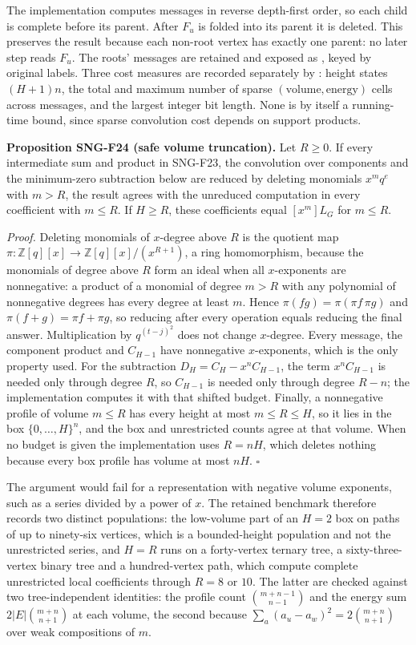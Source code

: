 \documentclass[
  11pt,
  a4paper,
]{report}
\let\singularitytexttt\texttt
\renewcommand{\texttt}[1]{\singularitytexttt{\seqsplit{#1}}}
\begin{document}
The implementation computes messages in reverse depth-first order, so
each child is complete before its parent. After \(F_u\) is folded into
its parent it is deleted. This preserves the result because each
non-root vertex has exactly one parent: no later step reads \(F_u\). The
roots' messages are retained and exposed as \texttt{root\_messages},
keyed by original labels. Three cost measures are recorded separately by
\texttt{transfer\_statistics}: height states \((H+1)n\), the total and
maximum number of sparse \((\text{volume},\text{energy})\) cells across
messages, and the largest integer bit length. None is by itself a
running-time bound, since sparse convolution cost depends on support
products.

\textbf{Proposition SNG-F24 (safe volume truncation).} Let \(R\ge0\). If
every intermediate sum and product in SNG-F23, the convolution over
components and the minimum-zero subtraction below are reduced by
deleting monomials \(x^mq^e\) with \(m>R\), the result agrees with the
unreduced computation in every coefficient with \(m\le R\). If
\(H\ge R\), these coefficients equal \([x^m]L_G\) for \(m\le R\).

\emph{Proof.} Deleting monomials of \(x\)-degree above \(R\) is the
quotient map \(\pi:\mathbb Z[q][x]\to\mathbb Z[q][x]/(x^{R+1})\), a ring
homomorphism, because the monomials of degree above \(R\) form an ideal
when all \(x\)-exponents are nonnegative: a product of a monomial of
degree \(m>R\) with any polynomial of nonnegative degrees has every
degree at least \(m\). Hence \(\pi(fg)=\pi(\pi f\,\pi g)\) and
\(\pi(f+g)=\pi f+\pi g\), so reducing after every operation equals
reducing the final answer. Multiplication by \(q^{(t-j)^2}\) does not
change \(x\)-degree. Every message, the component product and
\(C_{H-1}\) have nonnegative \(x\)-exponents, which is the only property
used. For the subtraction \(D_H=C_H-x^nC_{H-1}\), the term
\(x^nC_{H-1}\) is needed only through degree \(R\), so \(C_{H-1}\) is
needed only through degree \(R-n\); the implementation computes it with
that shifted budget. Finally, a nonnegative profile of volume \(m\le R\)
has every height at most \(m\le R\le H\), so it lies in the box
\(\{0,\ldots,H\}^n\), and the box and unrestricted counts agree at that
volume. When no budget is given the implementation uses \(R=nH\), which
deletes nothing because every box profile has volume at most \(nH\).
\(\square\)

The argument would fail for a representation with negative volume
exponents, such as a series divided by a power of \(x\). The retained
benchmark therefore records two distinct populations: the low-volume
part of an \(H=2\) box on paths of up to ninety-six vertices, which is a
bounded-height population and not the unrestricted series, and \(H=R\)
runs on a forty-vertex ternary tree, a sixty-three-vertex binary tree
and a hundred-vertex path, which compute complete unrestricted local
coefficients through \(R=8\) or \(10\). The latter are checked against
two tree-independent identities: the profile count
\(\binom{m+n-1}{n-1}\) and the energy sum \(2|E|\binom{m+n}{n+1}\) at
each volume, the second because \(\sum_a(a_u-a_w)^2=2\binom{m+n}{n+1}\)
over weak compositions of \(m\).
\end{document}
